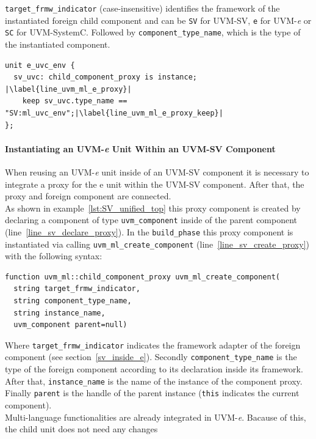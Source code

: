 \lstinline$target_frmw_indicator$ (case-insensitive) identifies the framework
of the instantiated foreign child component and can be \lstinline$SV$ for
UVM-SV, \lstinline$e$ for UVM-\textit{e} or \lstinline$SC$ for UVM-SystemC. Followed by
\lstinline$component_type_name$, which is the type of the instantiated component.
\medskip
\lstset{language=e, numbers=left, escapechar=|}
\begin{lstlisting}[frame=htrbl, caption={\textit{e}: instantiating the UVM-SV component in the UVM-\textit{e} unit},
label={lst:e_unified_top}]
unit e_uvc_env {
  sv_uvc: child_component_proxy is instance;	|\label{line_uvm_ml_e_proxy}|
    keep sv_uvc.type_name == "SV:ml_uvc_env";|\label{line_uvm_ml_e_proxy_keep}| 
};
\end{lstlisting}

\paragraph{Instantiating an UVM-\textit{e} Unit Within an UVM-SV Component}
When reusing an UVM-\textit{e} unit inside of an UVM-SV component it is
necessary to integrate a proxy for the e unit within the UVM-SV
component. After that, the proxy and foreign component are connected.\\
As shown in example~\ref{lst:SV_unified_top} this proxy component is created by
declaring a component of type \lstinline$uvm_component$ inside of the parent
component (line~\ref{line_sv_declare_proxy}). In the \lstinline$build_phase$ this proxy component is
instantiated via calling \lstinline$uvm_ml_create_component$ (line~\ref{line_sv_create_proxy}) with the following
syntax:
\medskip
{}
\begin{lstlisting}
function uvm_ml::child_component_proxy uvm_ml_create_component(
  string target_frmw_indicator,
  string component_type_name,
  string instance_name,
  uvm_component parent=null)
\end{lstlisting} 
\medskip
Where \lstinline$target_frmw_indicator$ indicates the framework adapter of the
foreign component (see section~\ref{sv_inside_e}). Secondly
\lstinline$component_type_name$ is the type of the foreign component according
to its declaration inside its framework. After that, \lstinline$instance_name$ is the name
of the instance of the component proxy. Finally \lstinline$parent$ is the handle of
the parent instance (\lstinline$this$ indicates the current component).\\
Multi-language functionalities are already integrated in UVM-\textit{e}. Bacause of this, the child unit does not need any changes

